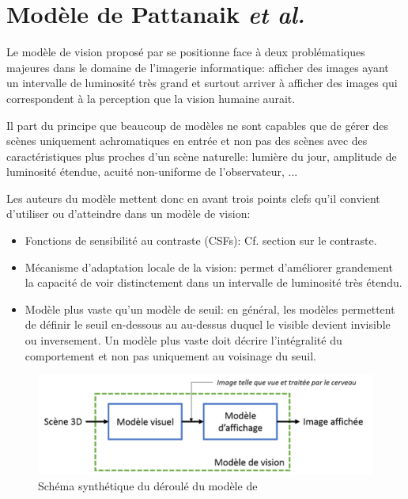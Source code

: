 	\chapter{Modèle de Pattanaik \textit{et al.}}
	\par Le modèle de vision proposé par \citep{pattanaik_multiscale_1998} se positionne face à deux problématiques majeures dans le domaine de l'imagerie informatique: afficher des images ayant un intervalle de luminosité très grand et surtout arriver à afficher des images qui correspondent à la perception que la vision humaine aurait.
	
	\par Il part du principe que beaucoup de modèles ne sont capables que de gérer des scènes uniquement achromatiques en entrée et non pas des scènes avec des caractéristiques plus proches d'un scène naturelle: lumière du jour, amplitude de luminosité étendue, acuité non-uniforme de l'observateur, ...
	
	\par Les auteurs du modèle mettent donc en avant trois points clefs qu'il convient d'utiliser ou d'atteindre dans un modèle de vision:
	\begin{itemize}
	\item Fonctions de sensibilité au contraste (CSFs): Cf. section sur le contraste.
	\item Mécanisme d'adaptation locale de la vision: permet d'améliorer grandement la capacité de voir distinctement dans un intervalle de luminosité très étendu.
	\item Modèle plus vaste qu'un modèle de seuil: en général, les modèles permettent de définir le seuil en-dessous au au-dessus duquel le visible devient invisible ou inversement. Un modèle plus vaste doit décrire l'intégralité du comportement et non pas uniquement au voisinage du seuil.
	\end{itemize}
	
	\begin{figure}
		\centering
		\includegraphics[scale=.75]{Figures/FlowChartPattanaik}
		\caption{Schéma synthétique du déroulé du modèle de \citep{pattanaik_multiscale_1998}}
		\label{fig:flowchart_pattanaik}
	\end{figure}
	
